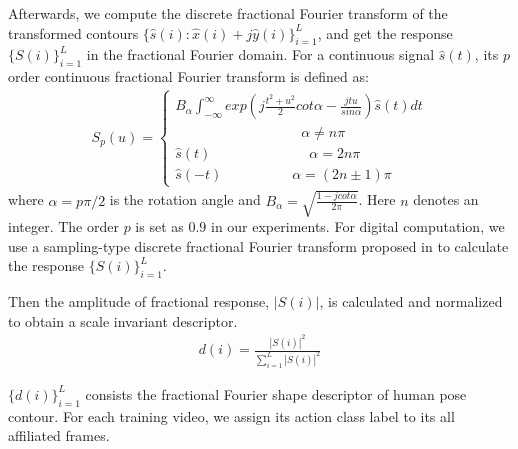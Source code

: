 \documentclass{article}
\begin{document}
Afterwards, we compute the discrete fractional Fourier transform of the transformed contours $\{\hat{s}(i):\hat{x}(i)+j\hat{y}(i)\}_{i=1}^{L}$,
and get the response $\{S(i)\}_{i=1}^{L}$ in the fractional Fourier domain.
For a continuous signal $\hat{s}(t)$, its $p$ order continuous fractional Fourier transform is defined as:
\begin{equation} \label{eq2}
 \begin{aligned}
 S_{p}(u)=
  \begin{cases}
B_{\alpha}\int_{-\infty}^{\infty}exp(j\frac{t^{2}+u^{2}}{2}cot\alpha-\frac{jtu}{sin\alpha})\hat{s}(t)dt \\
\quad \quad \quad \quad \quad \quad \quad \quad \quad   \alpha \neq n\pi \\
\hat{s}(t)     \quad \quad \quad \quad \quad \quad \quad \alpha =2n\pi \\
\hat{s}(-t)    \quad \quad \quad \quad \quad \alpha =(2n\pm1)\pi
  \end{cases}
 \end{aligned}
\end{equation}
where $\alpha=p\pi/2$ is the rotation angle and  $B_{\alpha}=\sqrt{\frac{1-jcot\alpha}{2\pi}}$.
Here  $n$ denotes an integer.
The order $p$ is set as $0.9$ in our experiments.
For digital computation, we use a sampling-type discrete fractional
Fourier transform proposed in \cite{Ozaktas} to calculate  the response $\{S(i)\}_{i=1}^{L}$. %


Then the amplitude of fractional response, $|S(i)|$, is calculated and normalized to obtain a scale invariant descriptor.
 \begin{equation} \label{eq5}
 \begin{aligned}
d(i)=\frac{|S(i)|^{2}}{\sum_{i=1}^{L}|S(i)|^{2}}
\end{aligned}
\end{equation}


$\{d(i)\}_{i=1}^{L}$ consists the fractional Fourier shape descriptor of human pose contour.
For each training video, we assign its action class label to  its all affiliated frames.
\end{document}
